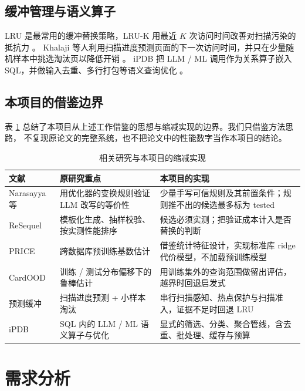 \documentclass[a4paper,zihao=-4,UTF8,fontset=windows,linespread=1.35]{ctexart}
\begin{document}
\subsection{缓冲管理与语义算子}
LRU 是最常用的缓冲替换策略，LRU-K 用最近 $K$ 次访问时间改善对扫描污染的抵抗力 \cite{oneil1993}。
Khalaji 等人利用扫描进度预测页面的下一次访问时间，并只在少量随机样本中挑选淘汰页以降低开销 \cite{khalaji2025}。
iPDB 把 LLM / ML 调用作为关系算子嵌入 SQL，并做输入去重、多行打包等语义查询优化 \cite{ipdb2026}。

\subsection{本项目的借鉴边界}
表 \ref{tab:borrow} 总结了本项目从上述工作借鉴的思想与缩减实现的边界。我们只借鉴方法思路，
不复现原论文的完整系统，也不把论文中的性能数字当作本项目的结论。

\begin{table}[!htb]
\centering\small
\caption{相关研究与本项目的缩减实现}\label{tab:borrow}
\begin{tabularx}{\textwidth}{>{\raggedright}p{2.6cm}>{\raggedright}X>{\raggedright\arraybackslash}X}
\toprule
文献 & 原研究重点 & 本项目的实现 \\
\midrule
Narasayya 等 \cite{narasayya2026} & 用优化器的变换规则验证 LLM 改写的等价性 & 少量手写可信规则及其前置条件；规则推不出的候选最多标为 tested \\
ReSequel \cite{resequel2026} & 模板化生成、抽样校验、按实测性能排序 & 候选必须实测；把验证成本计入是否替换的判断 \\
PRICE \cite{price2024} & 跨数据库预训练基数估计 & 借鉴统计特征设计，实现标准库 ridge 代价模型，不加载预训练模型 \\
CardOOD \cite{cardood2026} & 训练 / 测试分布偏移下的鲁棒估计 & 用训练集外的查询范围做留出评估，越界时回退启发式 \\
预测缓冲 \cite{khalaji2025} & 扫描进度预测 + 小样本淘汰 & 串行扫描感知、热点保护与扫描准入，证据不足时回退 LRU \\
iPDB \cite{ipdb2026} & SQL 内的 LLM / ML 语义算子与优化 & 显式的筛选、分类、聚合管线，含去重、批处理、缓存与预算 \\
\bottomrule
\end{tabularx}
\end{table}

\section{需求分析}\label{sec:req}
\end{document}
